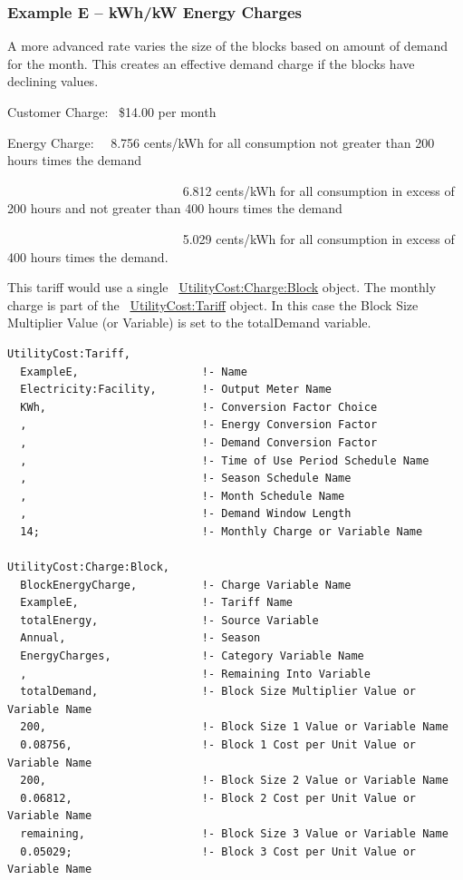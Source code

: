 \subsubsection{Example E -- kWh/kW Energy Charges}\label{example-e-kwhkw-energy-charges}

A more advanced rate varies the size of the blocks based on amount of demand for the month. This creates an effective demand charge if the blocks have declining values.

Customer Charge:~ \$14.00 per month

Energy Charge:~~ 8.756 cents/kWh for all consumption not greater than 200 hours times the demand

~~~~~~~~~~~~~~~~~~~~~~~~~~~ 6.812 cents/kWh for all consumption in excess of 200 hours and not greater than 400 hours times the demand

~~~~~~~~~~~~~~~~~~~~~~~~~~~ 5.029 cents/kWh for all consumption in excess of 400 hours times the demand.

This tariff would use a single ~\hyperref[utilitycostchargeblock]{UtilityCost:Charge:Block} object. The monthly charge is part of the ~\hyperref[utilitycosttariff]{UtilityCost:Tariff} object. In this case the Block Size Multiplier Value (or Variable) is set to the totalDemand variable.

\begin{lstlisting}
UtilityCost:Tariff,
  ExampleE,                   !- Name
  Electricity:Facility,       !- Output Meter Name
  KWh,                        !- Conversion Factor Choice
  ,                           !- Energy Conversion Factor
  ,                           !- Demand Conversion Factor
  ,                           !- Time of Use Period Schedule Name
  ,                           !- Season Schedule Name
  ,                           !- Month Schedule Name
  ,                           !- Demand Window Length
  14;                         !- Monthly Charge or Variable Name

UtilityCost:Charge:Block,
  BlockEnergyCharge,          !- Charge Variable Name
  ExampleE,                   !- Tariff Name
  totalEnergy,                !- Source Variable
  Annual,                     !- Season
  EnergyCharges,              !- Category Variable Name
  ,                           !- Remaining Into Variable
  totalDemand,                !- Block Size Multiplier Value or Variable Name
  200,                        !- Block Size 1 Value or Variable Name
  0.08756,                    !- Block 1 Cost per Unit Value or Variable Name
  200,                        !- Block Size 2 Value or Variable Name
  0.06812,                    !- Block 2 Cost per Unit Value or Variable Name
  remaining,                  !- Block Size 3 Value or Variable Name
  0.05029;                    !- Block 3 Cost per Unit Value or Variable Name
\end{lstlisting}

